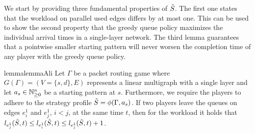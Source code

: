 We start by providing three fundamental properties of $\hat{S}$.
The first one states that the workload on parallel used edges differs by at most one. This can be used to show the second property that the greedy queue policy maximizes the individual arrival times in a single-layer network. The third lemma guarantees that a pointwise smaller starting pattern will never worsen the completion time of any player with the greedy queue policy.

\begin{restatable}{lemma}{lemmaAli}\label{lemma_ali}
Let $\Gamma$ be a packet routing game where $G(\Gamma)=(V=\{s,d\},E)$ represents a linear multigraph with a single layer and let $a_s\in \mathbb{N}_{\geq 0}^n$ be a starting pattern at $s$. Furthermore, we require the players to adhere to the strategy profile \mbox{$\hat{S}=\phi(\Gamma,a_s)$}. 
If two players leave the queues on edges $e^1_i$ and $e^1_j$, $i<j$, at the same time $t$, then for the workload it holds that $l_{e^1_j}(\hat{S},t) \leq l_{e^1_i}(\hat{S},t) \leq l_{e^1_j}(\hat{S},t)+1$.
\end{restatable}



